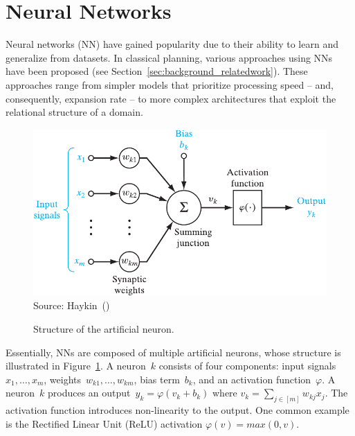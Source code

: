 \section{Neural Networks}
\label{sec:background_neuralnetworks}

Neural networks (NN) have gained popularity due to their ability to learn and generalize from datasets. In classical planning, various approaches using NNs have been proposed (see Section~\ref{sec:background_relatedwork}). These approaches range from simpler models that prioritize processing speed -- and, consequently, expansion rate -- to more complex architectures that exploit the relational structure of a domain.

\begin{figure}[ht]
    \caption{Structure of the artificial neuron.}
    \label{fig:neuron}
    \addvspace{\baselineskip}
    \centering
    \includegraphics[width=0.8\linewidth]{figures/neuron.pdf} \\
    \addvspace{\baselineskip}
    Source: Haykin~(\citeyear{Haykin/2009})
\end{figure}

Essentially, NNs are composed of multiple artificial neurons, whose structure is illustrated in Figure~\ref{fig:neuron}. A neuron~$k$ consists of four components: input signals~$x_1,\ldots,x_m$, weights~$w_{k1},\ldots,w_{km}$, bias term~$b_k$, and an activation function~$\varphi$. A neuron~$k$ produces an output~$y_k = \varphi(v_k + b_k)$ where $v_k = \sum_{j \in [m]} w_{kj} x_j$. The activation function introduces non-linearity to the output. One common example is the Rectified Linear Unit (ReLU) activation $\varphi(v) = max(0,v)$.

